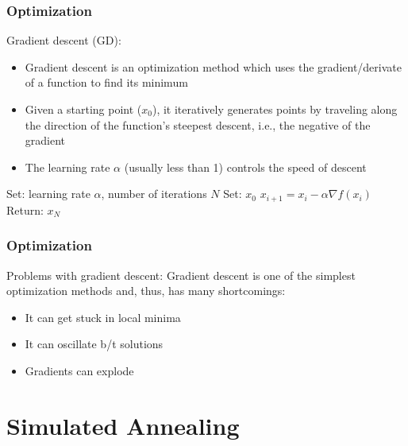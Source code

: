 \documentclass{beamer}
\begin{document}
\begin{frame}
	\frametitle{Optimization}
	
	\begin{alertblock}{Gradient descent (GD):}
		\footnotesize
		\begin{itemize}
			\item Gradient descent is an optimization method which uses the gradient/derivate of a function to find its minimum
			\item Given a starting point ($x_0$), it iteratively generates points by traveling along the direction of the function's steepest descent, i.e., the negative of the gradient
			\item The learning rate $\alpha$ (usually less than 1) controls the speed of descent
		\end{itemize}
	\end{alertblock}
	
	\begin{algorithm}[H]
		\caption{Gradient descent}
		\begin{algorithmic}[1]
			\STATE Set: learning rate $\alpha$, number of iterations $N$
			\STATE Set: $x_0$
				\STATE $x_{i+1} = x_i - \alpha \nabla f(x_i)$
			\ENDFOR
			\STATE Return: $x_N$
		\end{algorithmic}
	\end{algorithm}

\end{frame}

\begin{frame}
	\frametitle{Optimization}
	
	\begin{block}{Problems with gradient descent:}
		Gradient descent is one of the simplest optimization methods and, thus, has many shortcomings:
		\begin{itemize}
			\item It can get stuck in local minima
			\item It can oscillate b/t solutions
			\item Gradients can explode
		\end{itemize}
	\end{block}

\end{frame}


\section{Simulated Annealing}
\end{document}
